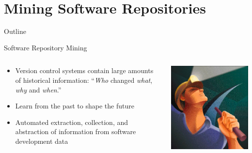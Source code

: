\section{Mining Software Repositories}

\begin{frame}{Outline}
  \tableofcontents[current]
\end{frame}

\note{
}

\begin{frame}{Software Repository Mining}
  \begin{columns}[c]
    \begin{column}{0.60\textwidth}
      \begin{itemize}
      \item Version control systems contain large amounts of
        historical information: ``\textit{Who} changed \textit{what},
        \textit{why} and \textit{when}.''
      \item Learn from the past to shape the future
      \item Automated extraction, collection, and abstraction of
        information from software development data
      \end{itemize}
    \end{column}
    \begin{column}{0.40\textwidth}
      \includegraphics[width=\textwidth]{figures/mining}
    \end{column}
  \end{columns}
\end{frame}

